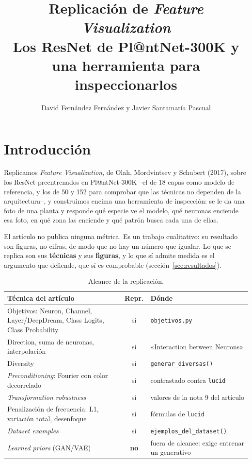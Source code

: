 \documentclass[11pt,a4paper]{article}
\title{\vspace{-1.5cm}\textbf{Replicación de \emph{Feature Visualization}}\\[3pt]
\large Los ResNet de Pl@ntNet-300K y una herramienta para inspeccionarlos}
\author{David Fernández Fernández y Javier Santamaría Pascual}
\date{}
\begin{document}
\maketitle

\section{Introducción}

Replicamos \emph{Feature Visualization}, de Olah, Mordvintsev y Schubert
(2017), sobre los ResNet preentrenados en Pl@ntNet-300K --el de 18 capas
como modelo de referencia, y los de 50 y 152 para comprobar que las
técnicas no dependen de la arquitectura--, y construimos encima una
herramienta de inspección: se le da una foto de una planta y responde qué
especie ve el modelo, qué neuronas enciende esa foto, en qué zona las
enciende y qué patrón busca cada una de ellas.

El artículo no publica ninguna métrica. Es un trabajo cualitativo: su
resultado son figuras, no cifras, de modo que no hay un número que igualar.
Lo que se replica son sus \textbf{técnicas} y sus \textbf{figuras}, y lo que
sí admite medida es el argumento que defiende, que sí es comprobable
(sección~\ref{sec:resultados}).

\begin{table}[htb]
\centering\small
\caption{Alcance de la replicación.}
\begin{tabular}{L{8.1cm} c L{5.1cm}}
\toprule
\textbf{Técnica del artículo} & \textbf{Repr.} & \textbf{Dónde} \\
\midrule
Objetivos: Neuron, Channel, Layer/DeepDream, Class Logits, Class
Probability & sí & \texttt{objetivos.py} \\
Direction, suma de neuronas, interpolación & sí & «Interaction between
Neurons» \\
Diversity & sí & \texttt{generar\_diversas()} \\
\emph{Preconditioning}: Fourier con color decorrelado & sí & contrastado
contra \texttt{lucid} \\
\emph{Transformation robustness} & sí & valores de la nota 9 del artículo \\
Penalización de frecuencia: L1, variación total, desenfoque & sí & fórmulas
de \texttt{lucid} \\
\emph{Dataset examples} & sí & \texttt{ejemplos\_del\_dataset()} \\
\emph{Learned priors} (GAN/VAE) & \textbf{no} & fuera de alcance: exige
entrenar un generativo \\
\bottomrule
\end{tabular}
\end{table}
\end{document}
